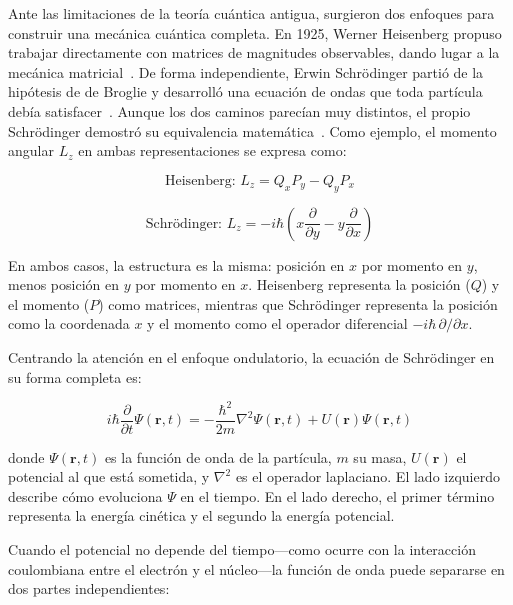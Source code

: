 \documentclass[11pt,a4paper,spanish]{book}
\begin{document}
Ante las limitaciones de la teoría cuántica antigua, surgieron dos
enfoques para construir una mecánica cuántica completa. En 1925,
Werner Heisenberg propuso trabajar directamente con matrices de
magnitudes observables, dando lugar a la mecánica
matricial~\citep{heisenberg1925}. De forma independiente, Erwin
Schrödinger partió de la hipótesis de de Broglie y desarrolló una
ecuación de ondas que toda partícula debía
satisfacer~\citep{schrodinger1926}. Aunque los dos caminos parecían
muy distintos, el propio Schrödinger demostró su equivalencia
matemática~\citep{schrodinger1926_equivalencia}. Como ejemplo, el momento
angular \(L_z\) en ambas representaciones se expresa como:

\begin{equation}
  \text{Heisenberg: } L_z = Q_x P_y - Q_y P_x
  \label{eq:heisenberg_lz}
\end{equation}

\begin{equation}
  \text{Schrödinger: } L_z = -i\hbar\left(x\frac{\partial}{\partial
  y} - y\frac{\partial}{\partial x}\right)
  \label{eq:schrodinger_lz}
\end{equation}

En ambos casos, la estructura es la misma: posición en \(x\) por
momento en \(y\), menos posición en \(y\) por momento en \(x\).
Heisenberg representa la posición (\(Q\)) y el momento (\(P\)) como
matrices, mientras que Schrödinger representa la posición como la
coordenada \(x\) y el momento como el operador diferencial
\(-i\hbar\,\partial/\partial x\).

\noindent Centrando la atención en el enfoque ondulatorio, la
ecuación de Schrödinger en su forma completa es:

\begin{equation}
  i\hbar\frac{\partial}{\partial t}\Psi(\mathbf{r},t) =
  -\frac{\hbar^2}{2m}\nabla^2\Psi(\mathbf{r},t) +
  U(\mathbf{r})\Psi(\mathbf{r},t)
  \label{eq:schrodinger_td}
\end{equation}

donde \(\Psi(\mathbf{r},t)\) es la función de onda de la partícula,
\(m\) su masa, \(U(\mathbf{r})\) el potencial al que está sometida, y
\(\nabla^2\) es el operador laplaciano. El lado izquierdo describe
cómo evoluciona \(\Psi\) en el tiempo. En el lado derecho, el primer
término representa la energía cinética y el segundo la energía potencial.

Cuando el potencial no depende del tiempo—como ocurre con la
interacción coulombiana entre el electrón y el núcleo—la función de
onda puede separarse en dos partes independientes:
\end{document}
